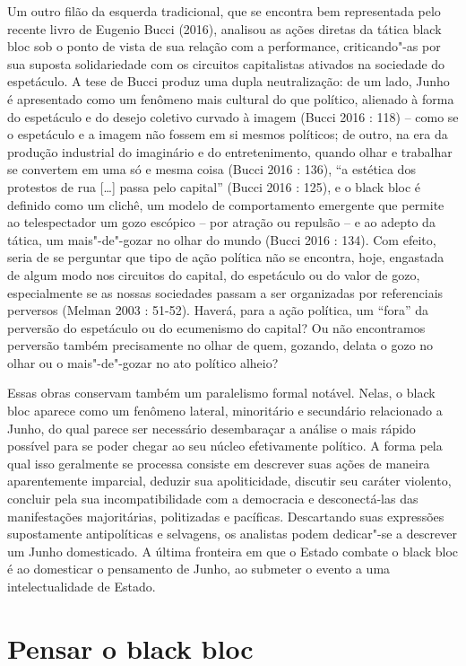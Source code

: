 Um outro filão da esquerda tradicional, que se encontra bem representada
pelo recente livro de Eugenio Bucci (2016), analisou as ações diretas da
tática black bloc sob o ponto de vista de sua relação com a performance,
criticando"-as por sua suposta solidariedade com os circuitos
capitalistas ativados na sociedade do espetáculo. A tese de Bucci produz
uma dupla neutralização: de um lado, Junho é apresentado como um
fenômeno mais cultural do que político, alienado à forma do espetáculo e
do desejo coletivo curvado à imagem (Bucci 2016 : 118) -- como se o
espetáculo e a imagem não fossem em si mesmos políticos; de outro, na
era da produção industrial do imaginário e do entretenimento, quando
olhar e trabalhar se convertem em uma só e mesma coisa (Bucci 2016 :
136), ``a estética dos protestos de rua {[}\ldots{}{]} passa pelo
capital'' (Bucci 2016 : 125), e o black bloc é definido como um clichê,
um modelo de comportamento emergente que permite ao telespectador um
gozo escópico -- por atração ou repulsão -- e ao adepto da tática, um
mais"-de"-gozar no olhar do mundo (Bucci 2016 : 134). Com efeito, seria de
se perguntar que tipo de ação política não se encontra, hoje, engastada
de algum modo nos circuitos do capital, do espetáculo ou do valor de
gozo, especialmente se as nossas sociedades passam a ser organizadas por
referenciais perversos (Melman 2003 : 51-52). Haverá, para a ação
política, um ``fora'' da perversão do espetáculo ou do ecumenismo do
capital? Ou não encontramos perversão também precisamente no olhar de
quem, gozando, delata o gozo no olhar ou o mais"-de"-gozar no ato político
alheio?

Essas obras conservam também um paralelismo formal notável. Nelas, o
black bloc aparece como um fenômeno lateral, minoritário e secundário
relacionado a Junho, do qual parece ser necessário desembaraçar a
análise o mais rápido possível para se poder chegar ao seu núcleo
efetivamente político. A forma pela qual isso geralmente se processa
consiste em descrever suas ações de maneira aparentemente imparcial,
deduzir sua apoliticidade, discutir seu caráter violento, concluir pela
sua incompatibilidade com a democracia e desconectá-las das
manifestações majoritárias, politizadas e pacíficas. Descartando suas
expressões supostamente antipolíticas e selvagens, os analistas podem
dedicar"-se a descrever um Junho domesticado. A última fronteira em que o
Estado combate o black bloc é ao domesticar o pensamento de Junho, ao
submeter o evento a uma intelectualidade de Estado.

\section{Pensar o black bloc}


